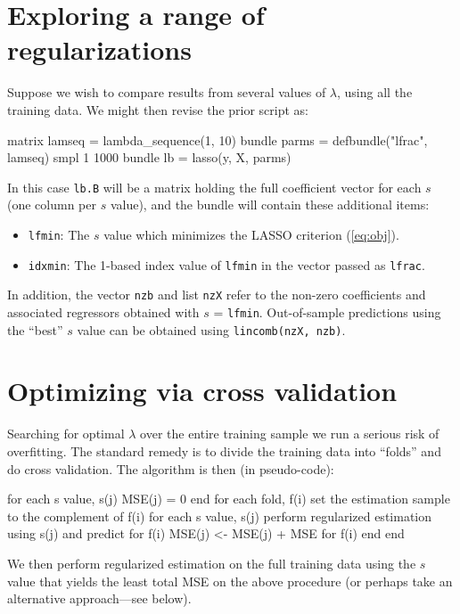 \documentclass{article}
\begin{document}
\section{Exploring a range of regularizations}
\label{sec:simple-search}

Suppose we wish to compare results from several values of $\lambda$,
using all the training data. We might then revise the prior script as:
\begin{code}
matrix lamseq = lambda_sequence(1, 10)
bundle parms = defbundle("lfrac", lamseq)
smpl 1 1000
bundle lb = lasso(y, X, parms)
\end{code}

In this case \texttt{lb.B} will be a matrix holding the full
coefficient vector for each $s$ (one column per $s$ value), and the
bundle will contain these additional items:
\begin{itemize}
\item \texttt{lfmin}: The $s$ value which minimizes the LASSO
  criterion (\ref{eq:obj}).
\item \texttt{idxmin}: The 1-based index value of \texttt{lfmin} in
  the vector passed as \texttt{lfrac}.
\end{itemize}

In addition, the vector \texttt{nzb} and list \texttt{nzX} refer to
the non-zero coefficients and associated regressors obtained with $s$
= \texttt{lfmin}. Out-of-sample predictions using the ``best'' $s$
value can be obtained using \texttt{lincomb(nzX, nzb)}.

\section{Optimizing via cross validation}
\label{sec:xvalid}

Searching for optimal $\lambda$ over the entire training sample we run
a serious risk of overfitting. The standard remedy is to divide the
training data into ``folds'' and do cross validation. The algorithm is
then (in pseudo-code):
\begin{code}
for each s value, s(j)
  MSE(j) = 0
end
for each fold, f(i)
  set the estimation sample to the complement of f(i)
  for each s value, s(j)
    perform regularized estimation using s(j) and predict for f(i)
    MSE(j) <- MSE(j) + MSE for f(i)
  end
end
\end{code}
We then perform regularized estimation on the full training data using the
$s$ value that yields the least total MSE on the above procedure (or
perhaps take an alternative approach---see below).
\end{document}
